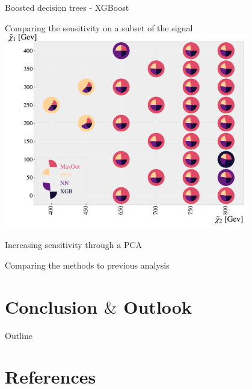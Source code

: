 \documentclass[UKenglish]{beamer}
\begin{document}
\begin{frame}{Boosted decision trees - XGBoost}
 
\end{frame}
\begin{frame}{Comparing the sensitivity on a subset of the signal}
    \centering
    \includegraphics[width=0.8\textwidth]{figures/Comps/GenPlussXGBNetworkComp.pdf}
\end{frame}

\begin{frame}{Increasing sensitivity through a PCA}
    
\end{frame}


\begin{frame}{Comparing the methods to previous analysis}
    
\end{frame}
\section{Conclusion $\&$ Outlook}
\begin{frame}{Outline}
    \tableofcontents[currentsection]
\end{frame}




\section{References}
\end{document}
